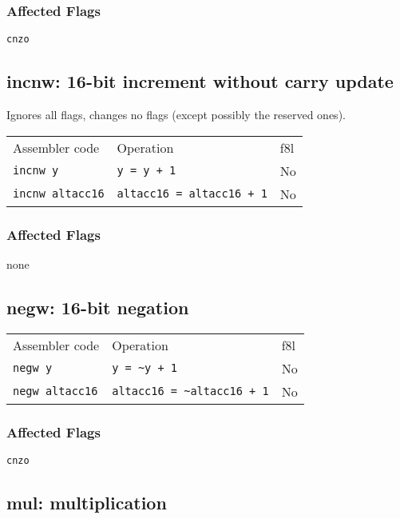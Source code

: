 \documentclass{book}
\begin{document}
\subsubsection*{Affected Flags}

\texttt{cnzo}


\subsection{incnw: 16-bit increment without carry update}

Ignores all flags, changes no flags (except possibly the reserved ones).

\begin{tabular}{l l l}
Assembler code          & Operation                        & f8l \\
\texttt{incnw y}        & \texttt{y = y + 1}               & No \\
\texttt{incnw altacc16} & \texttt{altacc16 = altacc16 + 1} & No \\
\end{tabular}

\subsubsection*{Affected Flags}

none


\subsection{negw: 16-bit negation}

\begin{tabular}{l l l}
Assembler code         & Operation                            & f8l \\
\texttt{negw y}        & \texttt{y = \~{}y + 1}               & No \\
\texttt{negw altacc16} & \texttt{altacc16 = \~{}altacc16 + 1} & No \\
\end{tabular}

\subsubsection*{Affected Flags}

\texttt{cnzo}


\subsection{mul: multiplication}
\end{document}
